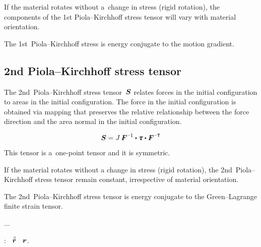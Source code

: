If the material rotates without a~change in stress (rigid rotation), the components of the 1st Piola\hbox{--}Kirchhoff stress tensor will vary with material orientation.

The 1st~Piola\hbox{--}Kirchhoff stress is energy conjugate to the motion gradient.

\subsection*{2nd Piola\hbox{--}Kirchhoff stress tensor}

The 2nd~Piola\hbox{--}Kirchhoff stress tensor~$\bm{S}$ relates forces in the initial configuration to areas in the initial configuration.
The force in the initial configuration is obtained via mapping that preserves the relative relationship between the force direction and the area normal in the initial configuration.

\noindent\vspace{-0.2em}\begin{equation*}
\secondpiolakirchhoffstress = J \, \bm{F}^{\expminusone} \dotp \cauchystress \dotp \bm{F}^{\expminusT}
\end{equation*}

This tensor is a~one\hbox{-}point tensor and it is symmetric.

If the material rotates without a change in stress (rigid rotation), the 2nd~Piola\hbox{--}Kirchhoff stress tensor remain constant, irrespective of material orientation.

The 2nd~Piola\hbox{--}Kirchhoff stress tensor is energy conjugate to the Green\hbox{--}Lagrange finite strain tensor.

...

\newpage



\label{section:variationofconfiguration}

  :  ~$\initiallocationvector$   ~$\bm{r}$.


